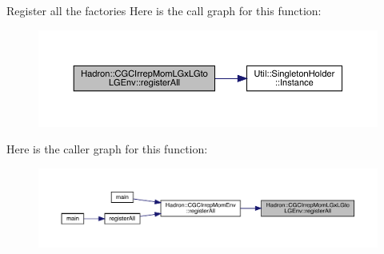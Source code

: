 Register all the factories Here is the call graph for this function\+:\nopagebreak
\begin{figure}[H]
\begin{center}
\leavevmode
\includegraphics[width=350pt]{de/dae/namespaceHadron_1_1CGCIrrepMomLGxLGtoLGEnv_ab765f2f3a5f090ad99642c37e973a15d_cgraph}
\end{center}
\end{figure}
Here is the caller graph for this function\+:
\nopagebreak
\begin{figure}[H]
\begin{center}
\leavevmode
\includegraphics[width=350pt]{de/dae/namespaceHadron_1_1CGCIrrepMomLGxLGtoLGEnv_ab765f2f3a5f090ad99642c37e973a15d_icgraph}
\end{center}
\end{figure}
